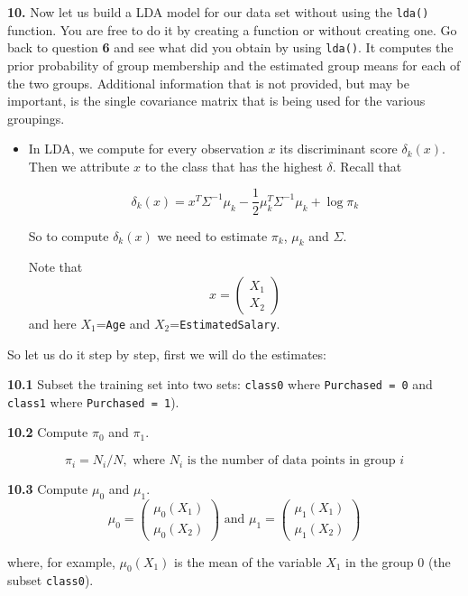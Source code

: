 \documentclass[]{book}
\newenvironment{rmdblock}[1]
  {\begin{shaded*}
  \begin{itemize}
  \renewcommand{\labelitemi}{
    \raisebox{-.7\height}[0pt][0pt]{
      {\setkeys{Gin}{width=2em,keepaspectratio}\texttt{[image: img/icons/\#1]}}
    }
  }
  \item
  }
  {
  \end{itemize}
  \end{shaded*}
  }
\newenvironment{rmdinsight}
  {\begin{rmdblock}{insight}}
  {\end{rmdblock}}
\theoremstyle{definition}
\theoremstyle{definition}
\theoremstyle{definition}
\theoremstyle{remark}
\begin{document}
\textbf{10.} Now let us build a LDA model for our data set without using
the \texttt{lda()} function. You are free to do it by creating a
function or without creating one. Go back to question \textbf{6} and see
what did you obtain by using \texttt{lda()}. It computes the prior
probability of group membership and the estimated group means for each
of the two groups. Additional information that is not provided, but may
be important, is the single covariance matrix that is being used for the
various groupings.

\begin{rmdinsight}
In LDA, we compute for every observation \(x\) its discriminant score
\(\delta_k(x)\). Then we attribute \(x\) to the class that has the
highest \(\delta\). Recall that

\[\delta_k(x) = x^T \Sigma^{-1} \mu_k - \frac{1}{2} \mu_k^T \Sigma^{-1}  \mu_k + \log \pi_k\]

So to compute \(\delta_k(x)\) we need to estimate \(\pi_k\), \(\mu_k\)
and \(\Sigma\).

Note that \[x=\begin{pmatrix}
            X_1 \\
            X_2
            \end{pmatrix}\] and here \(X_1\)=\texttt{Age} and
\(X_2\)=\texttt{EstimatedSalary}.
\end{rmdinsight}

So let us do it step by step, first we will do the estimates:

\textbf{10.1} Subset the training set into two sets: \texttt{class0}
where \texttt{Purchased\ =\ 0} and \texttt{class1} where
\texttt{Purchased\ =\ 1}).

\textbf{10.2} Compute \(\pi_0\) and \(\pi_1\).

\[\pi_i = N_i / N, \,\, \text{where} \,\, N_i \,\, \text{is the number of data points in group } i\]

\textbf{10.3} Compute \(\mu_0\) and \(\mu_1\). \[\mu_0 = \begin{pmatrix}
   \mu_0(X_1) \\
   \mu_0(X_2)
   \end{pmatrix} \,\, \text{and} \,\, \mu_1 = \begin{pmatrix}
   \mu_1(X_1) \\
   \mu_1(X_2)
   \end{pmatrix}\]

where, for example, \(\mu_0(X_1)\) is the mean of the variable \(X_1\)
in the group \(0\) (the subset \texttt{class0}).
\end{document}
